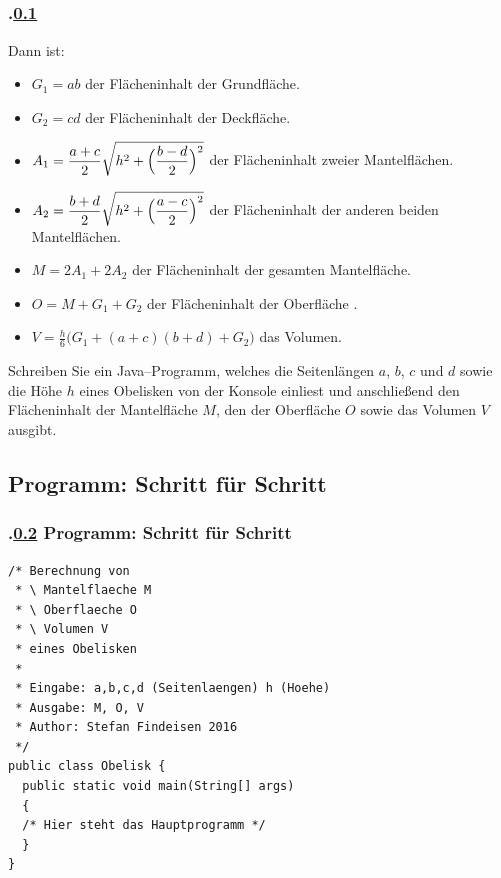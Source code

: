 \subsection{\stitle}\label{S:Formeln}
\begin{frame}[t]%
    \frametitle{\kap.\ref{S:Formeln} \stitle}%

Dann ist:
\begin{itemize}
\item $G_1 = ab$ der Fl\"acheninhalt der Grundfl\"ache.
\item $G_2 = cd$ der Fl\"acheninhalt der Deckfl\"ache.
\item $\displaystyle A_1 = \frac{a+c}{2} \sqrt{h^2 + \Bigl(\frac{b-d}{2}\Bigr)^2}$
der Fl\"acheninhalt zweier Mantelfl\"achen.
\item $\displaystyle A_2 = \frac{b+d}{2} \sqrt{h^2 + \Bigl(\frac{a-c}{2}\Bigr)^2}$
der Fl\"acheninhalt der anderen beiden Mantelfl\"achen.
\item $M = 2 A_1 + 2 A_2$ der Fl\"acheninhalt der gesamten Mantelfl\"ache.
\item $O = M + G_1 + G_2$ der Fl\"acheninhalt der Oberfl\"ache .
\item $\displaystyle V = \frac{h}{6}\bigl(G_1 + (a+c)(b+d) + G_2\bigr)$ das Volumen.
\end{itemize}
\medskip

Schreiben Sie ein Java--Programm, welches die Seitenl\"angen $a$, $b$, $c$ und $d$ sowie die H\"ohe $h$ eines Obelisken von der Konsole einliest und anschlie\ss end den Fl\"acheninhalt der Mantelfl\"ache $M$, den der Oberfl\"ache $O$ sowie das Volumen $V$ ausgibt.

\end{frame}


\def\stitle{Programm: Schritt für Schritt}%
\subsection{\stitle}\label{S:Code}
\begin{frame}[fragile]%
    \frametitle{\kap.\ref{S:Code} \stitle}%

\begin{lstlisting}[style=java,title={Programmgerüst.}]
/* Berechnung von
 * \ Mantelflaeche M
 * \ Oberflaeche O
 * \ Volumen V
 * eines Obelisken
 *
 * Eingabe: a,b,c,d (Seitenlaengen) h (Hoehe)
 * Ausgabe: M, O, V
 * Author: Stefan Findeisen 2016
 */
public class Obelisk {
  public static void main(String[] args)
  {
  /* Hier steht das Hauptprogramm */
  }
}
\end{lstlisting}
\end{frame}


